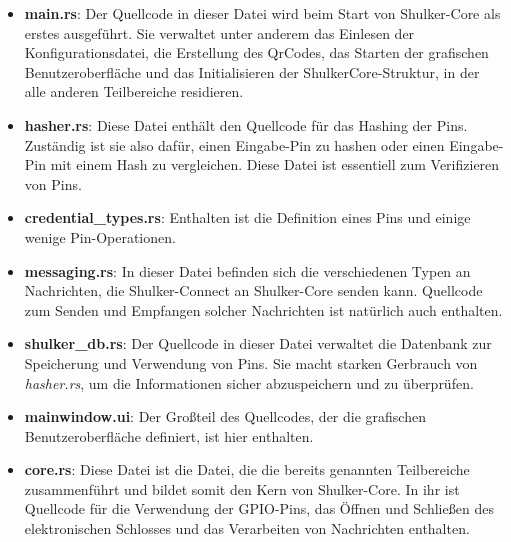 \begin{itemize}
    \item \textbf{main.rs}: Der Quellcode in dieser Datei wird beim Start von Shulker-Core als erstes ausgeführt. Sie verwaltet unter anderem
    das Einlesen der Konfigurationsdatei, die Erstellung des QrCodes, das Starten der grafischen Benutzeroberfläche und
    das Initialisieren der ShulkerCore-Struktur, in der alle anderen Teilbereiche residieren.

    \item \textbf{hasher.rs}: Diese Datei enthält den Quellcode für das Hashing der Pins. Zuständig ist sie also dafür, einen
    Eingabe-Pin zu hashen oder einen Eingabe-Pin mit einem Hash zu vergleichen. Diese Datei ist essentiell zum Verifizieren von Pins.

    \item \textbf{credential\_types.rs}: Enthalten ist die Definition eines Pins und einige wenige Pin-Operationen.
    
    \item \textbf{messaging.rs}: In dieser Datei befinden sich die verschiedenen Typen an Nachrichten, die Shulker-Connect an
    Shulker-Core senden kann. Quellcode zum Senden und Empfangen solcher Nachrichten ist natürlich auch enthalten.

    \item \textbf{shulker\_db.rs}: Der Quellcode in dieser Datei verwaltet die Datenbank zur Speicherung und Verwendung von Pins.
    Sie macht starken Gerbrauch von \textit{hasher.rs}, um die Informationen sicher abzuspeichern und zu überprüfen.

    \item \textbf{mainwindow.ui}: Der Großteil des Quellcodes, der die grafischen Benutzeroberfläche definiert, ist hier enthalten.

    \item \textbf{core.rs}: Diese Datei ist die Datei, die die bereits genannten Teilbereiche zusammenführt und bildet somit den Kern von
    Shulker-Core. In ihr ist Quellcode für die Verwendung der GPIO-Pins, das Öffnen und Schließen des elektronischen Schlosses und das Verarbeiten
    von Nachrichten enthalten.
\end{itemize}
